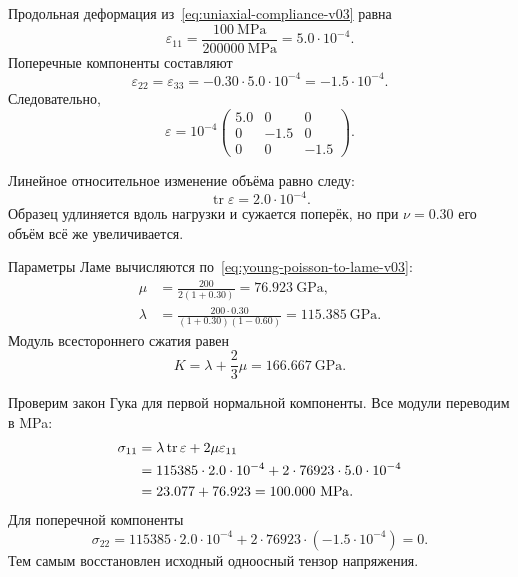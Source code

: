 Продольная деформация из~\eqref{eq:uniaxial-compliance-v03} равна
\begin{equation}
\label{eq:worked-longitudinal-strain-v03}
 \varepsilon_{11}
 =\frac{100\ \mathrm{MPa}}{200000\ \mathrm{MPa}}
 =5.0\cdot10^{-4}.
\end{equation}
Поперечные компоненты составляют
\begin{equation}
\label{eq:worked-transverse-strain-v03}
 \varepsilon_{22}=\varepsilon_{33}
 =-0.30\cdot5.0\cdot10^{-4}
 =-1.5\cdot10^{-4}.
\end{equation}
Следовательно,
\begin{equation}
\label{eq:worked-strain-tensor-v03}
 \varepsilon
 =10^{-4}
 \begin{pmatrix}
 5.0&0&0\\
 0&-1.5&0\\
 0&0&-1.5
 \end{pmatrix}.
\end{equation}

Линейное относительное изменение объёма равно следу:
\begin{equation}
\label{eq:worked-volume-strain-v03}
 \operatorname{tr}\varepsilon
 =2.0\cdot10^{-4}.
\end{equation}
Образец удлиняется вдоль нагрузки и сужается поперёк, но при $\nu=0.30$ его объём всё же увеличивается.

Параметры Ламе вычисляются по~\eqref{eq:young-poisson-to-lame-v03}:
\begin{align}
 \mu
 &=\frac{200}{2(1+0.30)}
 =76.923\ \mathrm{GPa},
 \label{eq:worked-mu-v03}\\
 \lambda
 &=\frac{200\cdot0.30}{(1+0.30)(1-0.60)}
 =115.385\ \mathrm{GPa}.
 \label{eq:worked-lambda-v03}
\end{align}
Модуль всестороннего сжатия равен
\begin{equation}
\label{eq:worked-bulk-v03}
 K=\lambda+\frac23\mu
 =166.667\ \mathrm{GPa}.
\end{equation}

Проверим закон Гука для первой нормальной компоненты. Все модули переводим в MPa:
\begin{align}
 \sigma_{11}
 &=\lambda\operatorname{tr}\varepsilon+2\mu\varepsilon_{11}
 \notag\\
 &=115385\cdot2.0\cdot10^{-4}
 +2\cdot76923\cdot5.0\cdot10^{-4}
 \notag\\
 &=23.077+76.923
 =100.000\ \mathrm{MPa}.
 \label{eq:worked-hooke-check-v03}
\end{align}
Для поперечной компоненты
\begin{equation}
\label{eq:worked-transverse-stress-check-v03}
 \sigma_{22}
 =115385\cdot2.0\cdot10^{-4}
 +2\cdot76923\cdot(-1.5\cdot10^{-4})
 =0.
\end{equation}
Тем самым восстановлен исходный одноосный тензор напряжения.

